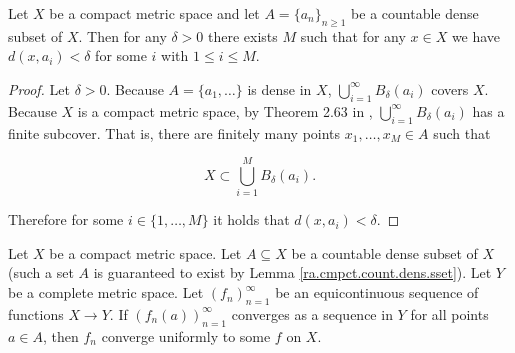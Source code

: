 \begin{lemma}\label{ra.lemma.arzela.ascoli}

Let \(X\) be a compact metric space and let \(A = \{a_n\}_{n \geq 1}\) be a countable dense subset of \(X\). Then for any \(\delta > 0\) there exists \(M\) such that for any \(x \in X\) we have \(d(x, a_i) < \delta\) for some \(i\) with \(1 \leq i \leq M\).

\end{lemma}

\begin{proof}

Let \(\delta > 0\). Because \(A = \{a_1, \ldots\}\) is dense in \(X\), \(\bigcup_{i=1}^\infty B_\delta(a_i)\) covers \(X\). Because \(X\) is a compact metric space, by Theorem 2.63 in \citet{pugh2015real}, \(\bigcup_{i=1}^\infty B_\delta(a_i)\) has a finite subcover. That is, there are finitely many points \(x_1, \ldots, x_{M} \in A\) such that 

\[
X \subset \bigcup_{i=1}^M B_\delta(a_i).
\] 

Therefore for some \(i \in \{1, \ldots, M\}\) it holds that \(d(x, a_i) < \delta\).



\end{proof}






\begin{theorem}

Let \(X\) be a compact metric space. Let \(A \subseteq X\) be a countable dense subset of \(X\) (such a set \(A\) is guaranteed to exist by Lemma \ref{ra.cmpct.count.dens.sset}). Let \(Y\) be a complete metric space. Let \((f_n)_{n=1}^\infty\) be an equicontinuous sequence of functions \(X \to Y\). If \((f_n(a))_{n=1}^\infty\) converges as a sequence in \(Y\) for all points \(a \in A\), then \(f_n\) converge uniformly to some \(f\) on \(X\). 

\end{theorem}

